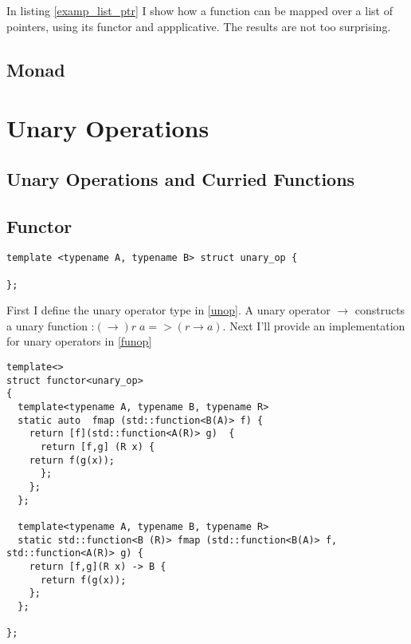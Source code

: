 \documentclass[12pt,fleqn]{article}
\begin{document}
In listing \ref{examp_list_ptr} I show how a function can be mapped over a list of pointers, using its functor and appplicative.
The results are not too surprising.

%
%
\subsection{Monad}

%
%
\section{Unary Operations}
%
%

\subsection{Unary Operations and Curried Functions}

\subsection{Functor}

%
%
%
\begin{minipage}{\linewidth}
\begin{lstlisting}[caption=unary operator, label=unop]
template <typename A, typename B> struct unary_op {
  
};
\end{lstlisting}
\end{minipage}
%
%
%

First I define the unary operator type in \ref{unop}.
A unary operator $\rightarrow$ constructs a unary function :$(\rightarrow) r\;a => (r \rightarrow a)$.
Next I'll provide an implementation for unary operators in \ref{funop}

%
%
%
\begin{minipage}{\linewidth}
\begin{lstlisting}[caption=functor for unary operators, label=funop]
template<>
struct functor<unary_op>
{
  template<typename A, typename B, typename R>
  static auto  fmap (std::function<B(A)> f) {  
    return [f](std::function<A(R)> g)  {
      return [f,g] (R x) {
	return f(g(x));
      };
    };
  };

  template<typename A, typename B, typename R>
  static std::function<B (R)> fmap (std::function<B(A)> f, std::function<A(R)> g) {  
    return [f,g](R x) -> B {
      return f(g(x));
    };
  };

};
\end{lstlisting}
\end{minipage}
%
%
%
\end{document}
